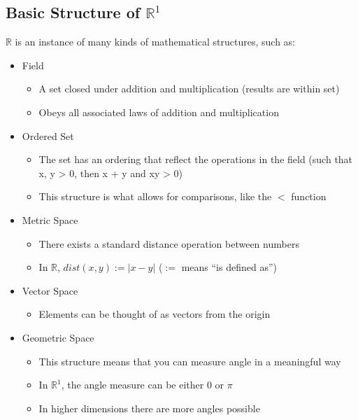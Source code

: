 \documentclass[11 pt, twoside]{article}
\begin{document}
\subsection{Basic Structure of $\mathbb{R}^1$}
$\mathbb{R}$ is an instance of many kinds of mathematical structures, such as:
\begin{itemize}
    \item Field
	\begin{itemize}
	\item A set closed under addition and multiplication (results are within set)
	\item Obeys all associated laws of addition and multiplication
	\end{itemize}
    \item Ordered Set
        \begin{itemize}
            \item The set has an ordering that reflect the operations in the
                field (such that x, y > 0, then x + y and  xy > 0)
            \item This structure is what allows for comparisons, like the $<$
                function
        \end{itemize}
    \item Metric Space
        \begin{itemize}
            \item There exists a standard distance operation between numbers
            \item In $\mathbb{R}$, $dist(x, y) := |x - y|$ ($:=$ means ``is
                defined as'')
        \end{itemize}
    \item Vector Space
        \begin{itemize}
            \item Elements can be thought of as vectors from the origin
        \end{itemize}
    \item Geometric Space
        \begin{itemize}
            \item This structure means that you can measure angle in a meaningful way
            \item In $\mathbb{R}^1$, the angle measure can be either $0$ or $\pi$
            \item In higher dimensions there are more angles possible
        \end{itemize}
\end{itemize}
\end{document}
